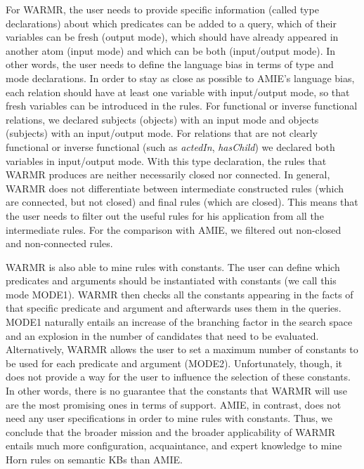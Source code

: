 {For WARMR, the user needs to provide specific information (called type declarations) about which predicates can be added to a query, which of their variables can be fresh (output mode),
which should have already appeared in another atom (input mode)
and which can be both (input/output mode). In other words, the user needs to define the language bias in terms of type and mode declarations.
In order to stay as close as possible to AMIE's language bias, each relation should have at least one variable with input/output mode, so that fresh variables can be introduced in the rules.
For functional or inverse functional relations, we declared subjects (objects) with an input mode and objects (subjects) with an input/output mode.
For relations that are not clearly functional or inverse functional (such as \emph{actedIn}, \emph{hasChild}) we declared both variables in input/output mode.
With this type declaration, the rules that WARMR produces are neither necessarily closed nor connected.
In general, WARMR does not differentiate between intermediate constructed rules (which are connected, but not closed) and final rules (which are closed).
This means that the user needs to filter out the useful rules for his application from all the intermediate rules.
For the comparison with AMIE, we filtered out non-closed and non-connected rules.

WARMR is also able to mine rules with constants. The user can define which predicates and arguments should be instantiated with constants (we call this mode MODE1).
WARMR then checks all the constants appearing in the facts of that specific predicate and argument and afterwards uses them in the queries.
MODE1 naturally entails an increase of the branching factor in the search space and an explosion in the number of candidates that need to be evaluated.
Alternatively, WARMR allows the user to set a maximum number of constants to be used for each predicate and argument (MODE2).
Unfortunately, though, it does not provide a way for the user to influence the selection of these constants.
In other words, there is no guarantee that the constants that WARMR will use are the most promising ones in terms of support. AMIE, in contrast, does not need any user specifications in order to mine rules with constants.
Thus, we conclude that the broader mission and the broader applicability of WARMR entails much more configuration,
acquaintance, and expert knowledge to mine Horn rules on semantic KBs than AMIE.

}
